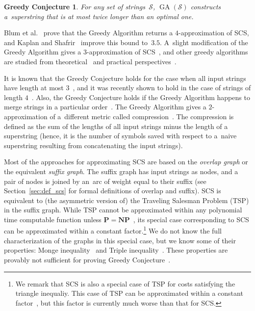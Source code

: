 \newtheorem*{gc}{Greedy Conjecture}
\begin{gc}
For any set of strings~$\mathcal{S}$, $\operatorname{GA}(\mathcal{S})$ constructs a~superstring that is at most twice longer than an optimal one.
\end{gc}


Blum et al.~\cite{BJLTY1991} prove that the Greedy Algorithm returns a $4$-approximation of SCS, and Kaplan and Shafrir~\cite{KS2005} improve this bound to~$3.5$. A~slight modification of the Greedy Algorithm gives a $3$-approximation of SCS~\cite{BJLTY1991}, and other greedy algorithms are studied from theoretical~\cite{BJLTY1991,rivals2018superstrings} and practical perspectives~\cite{romero2004experimental, cazaux2018practical}.

It is known that the Greedy Conjecture holds for the case when all input strings have length at most $3$~\cite{TU1988, cazaux20143}, and it was recently shown to hold in the case of strings of length $4$~\cite{kulikov2015greedy}. Also, the Greedy Conjecture holds if the Greedy Algorithm happens to merge strings in a particular order~\cite{weinard2006greedy, laube2005conditional}. The Greedy Algorithm gives a $2$-approximation of a~different metric called compression~\cite{TU1988}. The compression is defined as the sum of the lengths of all input strings minus the length of a superstring
(hence, it is the number of symbols saved with respect to a~naive superstring resulting from concatenating the input strings).



Most of the approaches for approximating SCS are based on the
{\em overlap graph} or the equivalent \emph{suffix graph}. The suffix graph has input strings as nodes, and a pair of nodes 
is joined by an~arc of weight equal to their suffix (see Section~\ref{sec:def_scs} for formal definitions of overlap and suffix).
SCS is equivalent to (the asymmetric version of) the Traveling Salesman Problem (TSP) in the suffix graph. While TSP cannot be approximated within any polynomial time computable function unless $\mathbf{P}=\mathbf{NP}$~\cite{SG1976}, its special case corresponding to SCS can be approximated within a constant factor.\footnote{We remark that SCS is also a special case of TSP for costs satisfying the triangle inequaliy. This case of TSP can be approximated within a constant factor~\cite{svensson2018constant}, but this factor is currently much worse than that for SCS.} We do not know the full characterization of the graphs in this special case, but we know some of their properties: Monge inequality~\cite{monge} and Triple inequality~\cite{weinard2006greedy}. These properties are provably not sufficient for proving Greedy Conjecture~\cite{weinard2006greedy, laube2005conditional}. 

